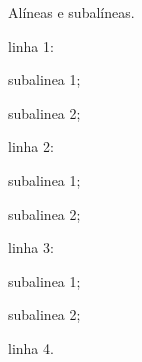 Alíneas e subalíneas.
\bigskip

\begin{alineas}
	\item linha 1:
	\begin{alineas}
		\item subalinea 1;
		\item subalinea 2;
	\end{alineas}
	\item linha 2:
	\begin{subalineas}
		\item subalinea 1;
		\item subalinea 2;
	\end{subalineas}
	\item linha 3:
	\begin{incisos}
		\item subalinea 1;
		\item subalinea 2;
	\end{incisos}
	\item linha 4.
\end{alineas}